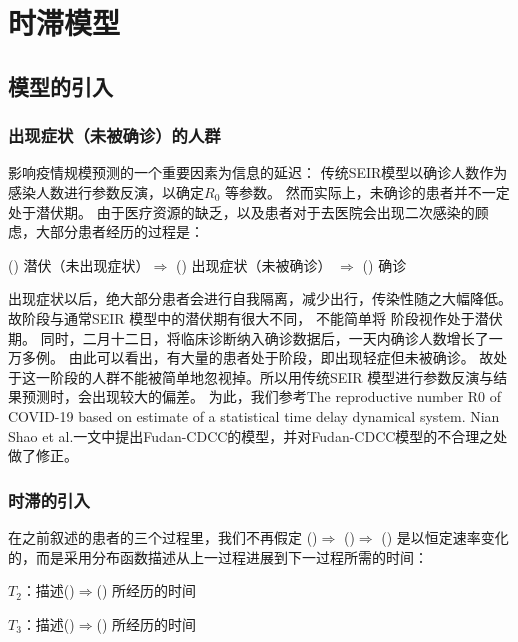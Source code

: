 \documentclass[UTF8]{ctexart}
\begin{document}
	\section{时滞模型}
		\subsection{模型的引入}
			\subsubsection{出现症状（未被确诊）的人群}
				影响疫情规模预测的一个重要因素为信息的延迟：
				传统SEIR模型以确诊人数作为感染人数进行参数反演，以确定$R_0$ 等参数。
				然而实际上，未确诊的患者并不一定处于潜伏期。
				由于医疗资源的缺乏，以及患者对于去医院会出现二次感染的顾虑，大部分患者经历的过程是：
				
				(\uppercase\expandafter{}) 潜伏（未出现症状）$\Rightarrow$
				(\uppercase\expandafter{}) 出现症状（未被确诊） $\Rightarrow$
				(\uppercase\expandafter{}) 确诊
				
				出现症状以后，绝大部分患者会进行自我隔离，减少出行，传染性随之大幅降低。
				故\uppercase\expandafter{}阶段与通常SEIR 模型中的潜伏期有很大不同，
				不能简单将\uppercase\expandafter{} 阶段视作处于潜伏期。
				同时，二月十二日，将临床诊断纳入确诊数据后，一天内确诊人数增长了一万多例。
				由此可以看出，有大量的患者处于\uppercase\expandafter{}阶段，即出现轻症但未被确诊。
				故处于这一阶段的人群不能被简单地忽视掉。所以用传统SEIR 模型进行参数反演与结果预测时，会出现较大的偏差。
				为此，我们参考The reproductive number R0 of COVID-19 based on estimate of a statistical
				time delay dynamical system. Nian Shao et al.一文中提出Fudan-CDCC的模型，并对Fudan-CDCC模型的不合理之处做了修正。
	
			\subsubsection{时滞的引入}
				在之前叙述的患者的三个过程里，我们不再假定
				(\uppercase\expandafter{})$\Rightarrow$
				(\uppercase\expandafter{})$\Rightarrow$
				(\uppercase\expandafter{})
				是以恒定速率变化的，而是采用分布函数描述从上一过程进展到下一过程所需的时间：
				
				$T_2$：描述(\uppercase\expandafter{})$\Rightarrow$(\uppercase\expandafter{}) 所经历的时间
				
				$T_3$：描述(\uppercase\expandafter{})$\Rightarrow$(\uppercase\expandafter{}) 所经历的时间
				
\end{document}
